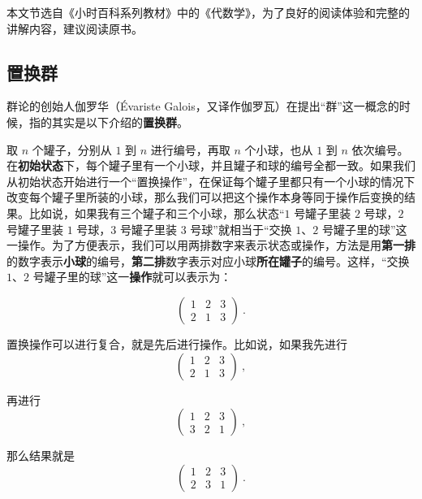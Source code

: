 

本文节选自《小时百科系列教材》中的《代数学》，为了良好的阅读体验和完整的讲解内容，建议阅读原书。


\subsection{置换群}

群论的创始人伽罗华（Évariste Galois，又译作伽罗瓦）在提出“群”这一概念的时候，指的其实是以下介绍的\textbf{置换群}。

取 $n$ 个罐子，分别从 $1$ 到 $n$ 进行编号，再取 $n$ 个小球，也从 $1$ 到 $n$ 依次编号。在\textbf{初始状态}下，每个罐子里有一个小球，并且罐子和球的编号全都一致。如果我们从初始状态开始进行一个“置换操作”，在保证每个罐子里都只有一个小球的情况下改变每个罐子里所装的小球，那么我们可以把这个操作本身等同于操作后变换的结果。比如说，如果我有三个罐子和三个小球，那么状态“$1$ 号罐子里装 $2$ 号球，$2$ 号罐子里装 $1$ 号球，$3$ 号罐子里装 $3$ 号球”就相当于“交换 $1$、$2$ 号罐子里的球”这一操作。为了方便表示，我们可以用两排数字来表示状态或操作，方法是用\textbf{第一排}的数字表示\textbf{小球}的编号，\textbf{第二排}数字表示对应小球\textbf{所在罐子}的编号。这样，“交换 $1$、$2$ 号罐子里的球”这一\textbf{操作}就可以表示为：

\begin{equation}\begin{pmatrix}
1&2&3\\2&1&3
\end{pmatrix}~.\end{equation}


置换操作可以进行复合，就是先后进行操作。比如说，如果我先进行\begin{equation}\begin{pmatrix}
1&2&3\\2&1&3
\end{pmatrix}~,\end{equation}

再进行\begin{equation}\begin{pmatrix}
1&2&3\\3&2&1
\end{pmatrix}~,\end{equation}

那么结果就是\begin{equation}\begin{pmatrix}
1&2&3\\2&3&1
\end{pmatrix}~.\end{equation}

